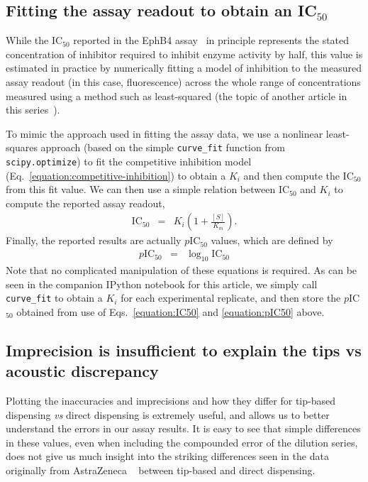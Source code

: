 \documentclass[aps,pre,twocolumn,nofootinbib,superscriptaddress,linenumbers]{revtex4-1}
\begin{document}
\subsection*{Fitting the assay readout to obtain an IC$_{50}$}

While the IC$_{50}$ reported in the EphB4 assay~\cite{ekins_dispensing_2013,barlaam_novel_2009,barlaam_pyrimidine_2010} in principle represents the stated concentration of inhibitor required to inhibit enzyme activity by half, this value is estimated in practice by numerically fitting a model of inhibition to the measured assay readout (in this case, fluorescence) across the whole range of concentrations measured using a method such as least-squared (the topic of another article in this series~\cite{jones_fitting_2015}).

To mimic the approach used in fitting the assay data, we use a nonlinear least-squares approach (based on the simple {\tt curve\_fit} function from {\tt scipy.optimize}) to fit the competitive inhibition model (Eq.~\ref{equation:competitive-inhibition}) to obtain a $K_i$ and then compute the IC$_{50}$ from this fit value.
We can then use a simple relation between IC$_{50}$ and $K_{i}$ to compute the reported assay readout,
\begin{eqnarray}
\mathrm{IC}_{50} &=& K_{i}\left(1+\frac{[S]}{K_{m}}\right) \label{equation:IC50} .
\end{eqnarray} 
Finally, the reported results are actually $p$IC$_{50}$ values, which are defined by 
\begin{eqnarray}
p\mathrm{IC}_{50} &=& \log_{10} \mathrm{IC}_{50} \label{equation:pIC50}
\end{eqnarray}
Note that no complicated manipulation of these equations is required.
As can be seen in the companion IPython notebook for this article, we simply call {\tt curve\_fit} to obtain a $K_i$ for each experimental replicate, and then store the $p$IC$_{50}$ obtained from use of Eqs.~\ref{equation:IC50} and \ref{equation:pIC50} above.

\subsection*{Imprecision is insufficient to explain the tips vs acoustic discrepancy}

Plotting the inaccuracies and imprecisions and how they differ for tip-based dispensing \emph{vs} direct dispensing is extremely useful, and allows us to better understand the errors in our assay results. 
It is easy to see that simple differences in these values, even when including the compounded error of the dilution series, does not give us much insight into the striking differences seen in the data originally from AstraZeneca ~\cite{ekins_dispensing_2013,barlaam_novel_2009,barlaam_pyrimidine_2010} between tip-based and direct dispensing.
\end{document}
